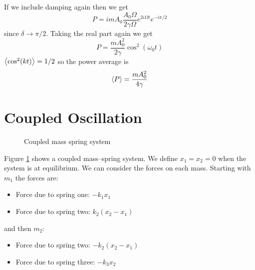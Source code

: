 \documentclass{article}
\begin{document}
    If we include damping again then we get
    \[P = imA_0\frac{A_0\Omega}{2\gamma\Omega}e^{2i\Omega t}e^{-i\pi/2}\]
    since \(\delta \to \pi/2\).
    Taking the real part again we get
    \[P = \frac{mA_0^2}{2\gamma}\cos^2(\omega_0 t)\]
    \(\left\langle{\cos^2(kt)}\right\rangle = 1/2\) so the power average is
    \[\left\langle{P}\right\rangle = \frac{mA_0^2}{4\gamma}\]
    
    \section{Coupled Oscillation}
    \begin{figure}[ht]
        \centering
        \caption{Coupled mass spring system}
        \label{fig:mass spring coupled system}
    \end{figure}
    Figure \ref{fig:mass spring coupled system} shows a coupled mass--spring system.
    We define \(x_1 = x_2 = 0\) when the system is at equilibrium.
    We can consider the forces on each mass.
    Starting with \(m_1\) the forces are:
    \begin{itemize}
        \item Force due to spring one: \(-k_1x_1\)
        \item Force due to spring two: \(k_2(x_2 - x_1)\)
    \end{itemize}
    and then \(m_2\):
    \begin{itemize}
        \item Force due to spring two: \(-k_2(x_2 - x_1)\)
        \item Force due to spring three: \(-k_3 x_2\)
    \end{itemize}
\end{document}
